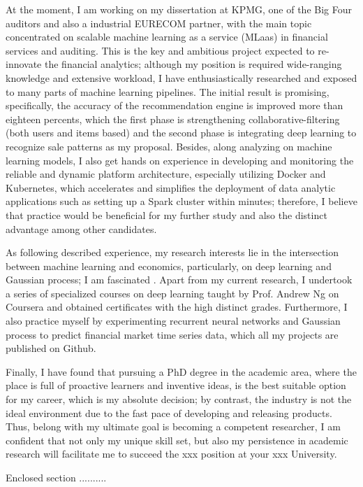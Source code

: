 \documentclass[11pt,a4paper,roman]{moderncv}        %
\begin{document}
At the moment, I am working on my dissertation at KPMG, one of the Big Four auditors and also a industrial EURECOM partner, with the main topic concentrated on scalable machine learning as a service (MLaas) in financial services and auditing. This is the key and ambitious project expected to re-innovate the financial analytics; although my position is required wide-ranging knowledge and extensive workload, I have enthusiastically researched and exposed to many parts of machine learning pipelines. The initial result is promising, specifically, the accuracy of the recommendation engine is improved more than eighteen percents, which the first phase is strengthening collaborative-filtering (both users and items based) and the second phase is integrating deep learning to recognize sale patterns as my proposal. Besides, along analyzing on machine learning models, I also get hands on experience in developing and monitoring the reliable and dynamic platform architecture, especially utilizing Docker and Kubernetes, which accelerates and simplifies the deployment of data analytic applications such as setting up a Spark cluster within minutes; therefore, I believe that practice would be beneficial for my further study and also the distinct advantage among other candidates.

As following described experience, my research interests lie in the intersection between machine learning and economics, particularly, on deep learning and Gaussian process; I am fascinated . Apart from my current research, I undertook a series of specialized courses on deep learning taught by Prof. Andrew Ng on Coursera and obtained certificates with the high distinct grades. Furthermore, I also practice myself by experimenting recurrent neural networks and Gaussian process to predict financial market time series data, which all my projects are published on Github.

Finally, I have found that pursuing a PhD degree in the academic area, where the place is full of proactive learners and inventive ideas, is the best suitable option for my career, which is my absolute decision; by contrast, the industry is not the ideal environment due to the fast pace of developing and releasing products. Thus, belong with my ultimate goal is becoming a competent researcher, I am confident that not only my unique skill set, but also my persistence in academic research will facilitate me to succeed the {xxx} position at your {xxx} University.

Enclosed section ..........



\vspace{0.5cm}


\makeletterclosing
\end{document}
